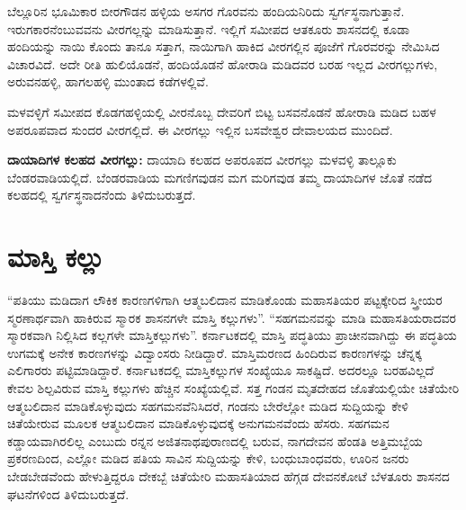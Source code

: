 ಬೆಲ್ಲೂರಿನ ಭೂಮಿಕಾರ ಬೀರಗೌಡನ ಹಳ್ಳಿಯ ಅಸಗರ ಗೊರವನು ಹಂದಿಯನಿರಿದು ಸ್ವರ್ಗಸ್ಥನಾಗುತ್ತಾನೆ. ಇರುಗಕಾರನೆಂಬು\-ವವನು ವೀರಗಲ್ಲನ್ನು ಮಾಡಿಸುತ್ತಾನೆ. ಇಲ್ಲಿಗೆ ಸಮೀಪದ ಆತಕೂರು ಶಾಸನದಲ್ಲಿ ಕೂಡಾ ಹಂದಿಯನ್ನು ನಾಯಿ ಕೊಂದು ತಾನೂ ಸತ್ತಾಗ, ನಾಯಿಗಾಗಿ ಹಾಕಿದ ವೀರಗಲ್ಲಿನ ಪೂಜೆಗೆ ಗೊರವರನ್ನು ನೇಮಿಸಿದ ವಿಚಾರವಿದೆ. ಅದೇ ರೀತಿ ಹುಲಿಯೊಡನೆ, ಹಂದಿಯೊಡನೆ ಹೋರಾಡಿ ಮಡಿದವರ ಬರಹ ಇಲ್ಲದ ವೀರಗಲ್ಲುಗಳು, ಅರುವನಹಳ್ಳಿ, ಹಾಗಲಹಳ್ಳಿ ಮುಂತಾದ ಕಡೆಗಳಲ್ಲಿವೆ.

ಮಳವಳ್ಳಿಗೆ ಸಮೀಪದ ಕೊಡಗಹಳ್ಳಿಯಲ್ಲಿ ವೀರನೊಬ್ಬ ದೇವರಿಗೆ ಬಿಟ್ಟ ಬಸವನೊಡನೆ ಹೋರಾಡಿ ಮಡಿದ ಬಹಳ ಅಪರೂಪವಾದ ಸುಂದರ ವೀರಗಲ್ಲಿದೆ. ಈ ವೀರಗಲ್ಲು ಇಲ್ಲಿನ ಬಸವೇಶ್ವರ ದೇವಾಲಯದ ಮುಂದಿದೆ.

\textbf{ದಾಯಾದಿಗಳ ಕಲಹದ ವೀರಗಲ್ಲು:} ದಾಯಾದಿ ಕಲಹದ ಅಪರೂಪದ ವೀರಗಲ್ಲು ಮಳವಳ್ಳಿ ತಾಲ್ಲೂಕು ಬೆಂಡರವಾಡಿಯಲ್ಲಿದೆ. ಬೆಂಡರವಾಡಿಯ ಮಗಣಿಗವುಡನ ಮಗ ಮರಿಗವುಡ ತಮ್ಮ ದಾಯಾದಿಗಳ ಜೊತೆ ನಡೆದ ಕಲಹದಲ್ಲಿ ಸ್ವರ್ಗಸ್ಥನಾದನೆಂದು ತಿಳಿದುಬರುತ್ತದೆ.


\section{ಮಾಸ್ತಿ ಕಲ್ಲು}

“ಪತಿಯು ಮಡಿದಾಗ ಲೌಕಿಕ ಕಾರಣಗಳಿಗಾಗಿ ಆತ್ಮಬಲಿದಾನ ಮಾಡಿಕೊಂಡು ಮಹಾಸತಿಯರ ಪಟ್ಟಕ್ಕೇರಿದ ಸ್ತ್ರೀಯರ ಸ್ಮರಣಾರ್ಥವಾಗಿ ಹಾಕಿರುವ ಸ್ಮಾರಕ ಶಾಸನಗಳೇ ಮಾಸ್ತಿ ಕಲ್ಲುಗಳು”. “ಸಹಗಮನವನ್ನು ಮಾಡಿ ಮಹಾಸತಿಯರಾದವರ ಸ್ಮಾರಕವಾಗಿ ನಿಲ್ಲಿಸಿದ ಕಲ್ಲಗಳೇ ಮಾಸ್ತಿಕಲ್ಲುಗಳು”. ಕರ್ನಾಟಕದಲ್ಲಿ ಮಾಸ್ತಿ ಪದ್ಧತಿಯು ಪ್ರಾಚೀನವಾಗಿದ್ದು ಈ ಪದ್ಧತಿಯ ಉಗಮಕ್ಕೆ ಅನೇಕ ಕಾರಣಗಳನ್ನು ವಿದ್ವಾಂಸರು ನೀಡಿದ್ದಾರೆ. ಮಾಸ್ತಿಮರಣದ ಹಿಂದಿರುವ ಕಾರಣಗಳನ್ನು ಚೆನ್ನಕ್ಕ ಎಲಿಗಾರರು ಪಟ್ಟಿಮಾಡಿದ್ದಾರೆ. ಕರ್ನಾಟಕದಲ್ಲಿ ಮಾಸ್ತಿಕಲ್ಲುಗಳ ಸಂಖ್ಯೆಯೂ ಸಾಕಷ್ಟಿದೆ. ಅದರಲ್ಲೂ ಬರಹವಿಲ್ಲದೆ ಕೇವಲ ಶಿಲ್ಪವಿರುವ ಮಾಸ್ತಿ ಕಲ್ಲುಗಳು ಹೆಚ್ಚಿನ ಸಂಖ್ಯೆಯಲ್ಲಿವೆ. ಸತ್ತ ಗಂಡನ ಮೃತದೇಹದ ಜೊತೆಯಲ್ಲಿಯೇ ಚಿತೆಯೇರಿ ಆತ್ಮಬಲಿದಾನ ಮಾಡಿಕೊಳ್ಳುವುದು ಸಹಗಮನವೆನಿಸಿದರೆ, ಗಂಡನು ಬೇರೆಲ್ಲೋ ಮಡಿದ ಸುದ್ದಿಯನ್ನು ಕೇಳಿ ಚಿತೆಯೇರುವ ಮೂಲಕ ಆತ್ಮಬಲಿದಾನ ಮಾಡಿಕೊಳ್ಳುವುದಕ್ಕೆ ಅನುಗಮನವೆಂದು ಹೆಸರು. ಸಹಗಮನ ಕಡ್ಡಾಯವಾಗಿರಲಿಲ್ಲ ಎಂಬುದು ರನ್ನನ ಅಜಿತನಾಥಪುರಾಣದಲ್ಲಿ ಬರುವ, ನಾಗದೇವನ ಹೆಂಡತಿ ಅತ್ತಿಮಬ್ಬೆಯ ಪ್ರಕರಣದಿಂದ, ಎಲ್ಲೋ ಮಡಿದ ಪತಿಯ ಸಾವಿನ ಸುದ್ದಿಯನ್ನು ಕೇಳಿ, ಬಂಧುಬಾಂಧವರು, ಊರಿನ ಜನರು ಬೇಡಬೇಡವೆಂದು ಹೇಳುತ್ತಿದ್ದರೂ ದೇಕಬ್ಬೆ ಚಿತೆಯೇರಿ ಮಹಾಸತಿಯಾದ ಹೆಗ್ಗಡ ದೇವನಕೋಟೆ ಬೆಳತೂರು ಶಾಸನದ ಘಟನೆಗಳಿಂದ ತಿಳಿದುಬರುತ್ತದೆ.

